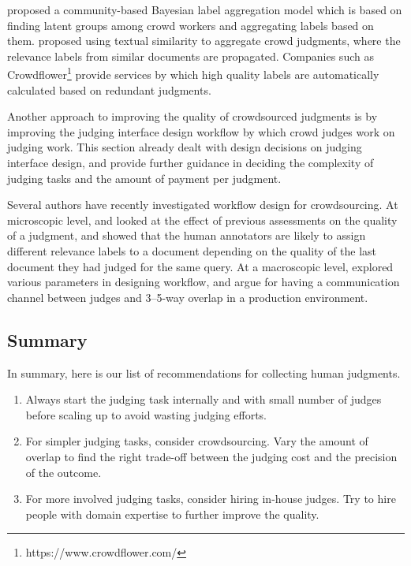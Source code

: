 \cite{Venanzi:2014} proposed a community-based Bayesian label aggregation model which is based on finding latent groups among crowd workers and aggregating labels based on them. \cite{Davtyan2015} proposed using textual similarity to aggregate crowd judgments, where the relevance labels from similar documents are propagated. Companies such as Crowdflower\footnote{https://www.crowdflower.com/} provide services by which high quality labels are automatically calculated based on redundant judgments.

Another approach to improving the quality of crowdsourced judgments is by improving the judging interface design workflow by which crowd judges work on judging work. This section already dealt with design decisions on judging interface design, and \cite{Kazai2012} provide further guidance in deciding the complexity of judging tasks and the amount of payment per judgment.

Several authors have recently investigated workflow design for crowdsourcing. At microscopic level, \cite{Scholer:2013} and \cite{Shokouhi:2015} looked at the effect of previous assessments on the quality of a judgment, and showed that the human annotators are likely to assign different relevance labels to a document depending on the quality of the last document they had judged for the same query. At a macroscopic level, \cite{Megorskaya2015} explored various parameters in designing workflow, and argue for having a communication channel between judges and 3--5-way overlap in a production environment.

\subsection{Summary}
In summary, here is our list of recommendations for collecting human judgments.

\begin{enumerate}
	\item Always start the judging task internally and with small number of judges before scaling up to avoid wasting judging efforts.
	\item For simpler judging tasks, consider crowdsourcing. Vary the amount of overlap to find the right trade-off between the judging cost and the precision of the outcome.
	\item For more involved judging tasks, consider hiring in-house judges. Try to hire people with domain expertise to further improve the quality.
\end{enumerate}

